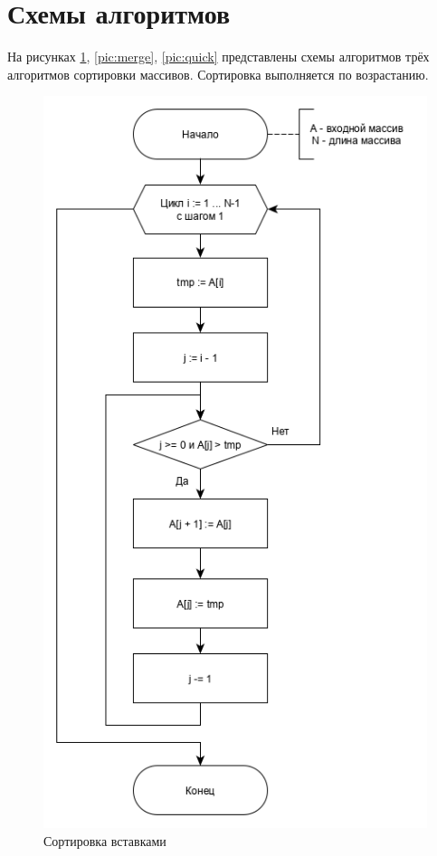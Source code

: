 \documentclass[12pt, a4paper]{report}
\begin{document}
	\section{Схемы алгоритмов}
	На рисунках \ref{pic:insert}, \ref{pic:merge}, \ref{pic:quick} представлены схемы алгоритмов трёх алгоритмов сортировки массивов. Сортировка выполняется по возрастанию.
	\begin{figure}[ht!]
		\centering
		\includegraphics[scale=0.8]{insert.png}
		\caption{Сортировка вставками}
		\label{pic:insert}
	\end{figure}
	\newpage
\end{document}
